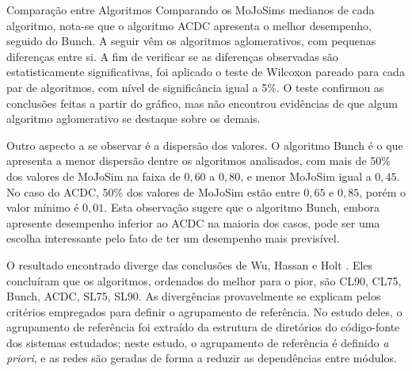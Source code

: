 \begin{section}{Comparação entre Algoritmos}
Comparando os MoJoSims medianos de cada algoritmo, nota-se que o algoritmo ACDC apresenta o melhor desempenho, seguido do Bunch. A seguir vêm os algoritmos aglomerativos, com pequenas diferenças entre si. A fim de verificar se as diferenças observadas são estatisticamente significativas, foi aplicado o teste de Wilcoxon pareado para cada par de algoritmos, com nível de significância igual a 5\%. O teste confirmou as conclusões feitas a partir do gráfico, mas não encontrou evidências de que algum algoritmo aglomerativo se destaque sobre os demais.



Outro aspecto a se observar é a dispersão dos valores. O algoritmo Bunch é o que apresenta a menor dispersão dentre os algoritmos analisados, com mais de 50\% dos valores de MoJoSim na faixa de $0,60$ a $0,80$, e menor MoJoSim igual a $0,45$. No caso do ACDC, 50\% dos valores de MoJoSim estão entre $0,65$ e $0,85$, porém o valor mínimo é $0,01$. Esta observação sugere que o algoritmo Bunch, embora apresente desempenho inferior ao ACDC na maioria dos casos, pode ser uma escolha interessante pelo fato de ter um desempenho mais previsível.

O resultado encontrado diverge das conclusões de Wu, Hassan e Holt \cite{Wu2005}. Eles concluíram que os algoritmos, ordenados do melhor para o pior, são CL90, CL75, Bunch, ACDC, SL75, SL90. As divergências provavelmente se explicam pelos critérios empregados para definir o agrupamento de referência. No estudo deles, o agrupamento de referência foi extraído da estrutura de diretórios do código-fonte dos sistemas estudados; neste estudo, o agrupamento de referência é definido \emph{a priori}, e as redes são geradas de forma a reduzir as dependências entre módulos.


\end{section}
